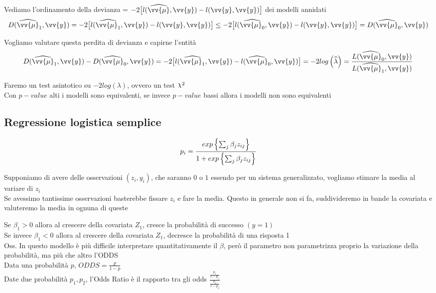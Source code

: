 Vediamo l'ordinamento della devianza = $-2\big[ l(\hat{\vv{\mu}},\vv{y}) - l(\vv{y},\vv{y}) \big]$ dei modelli annidati
\[
D(\hat{\vv{\mu}}_1,\vv{y}) = -2\big[ l(\hat{\vv{\mu}_1},\vv{y}) - l(\vv{y},\vv{y}) \big] \le -2\big[ l(\hat{\vv{\mu}_0},\vv{y}) - l(\vv{y},\vv{y}) \big] = D(\hat{\vv{\mu}}_0,\vv{y})
\]
\phantom{}

Vogliamo valutare questa perdita di devianza e capirne l'entità
\[
D(\hat{\vv{\mu}}_1,\vv{y})-D(\hat{\vv{\mu}}_0,\vv{y}) = -2\big[ l(\hat{\vv{\mu}_1},\vv{y}) - l(\hat{\vv{\mu}}_0,\vv{y}) \big] = -2log \O\hat{\lambda}\C = \frac{L(\hat{\vv{\mu}}_0,\vv{y})}{L(\hat{\vv{\mu}}_1,\vv{y})}
\]
\phantom{}

Faremo un test asintotico su $-2log(\lambda)$, ovvero un test $\Chi^2$\\
Con $p-value$ alti i modelli sono equivalenti, se invece $p-value$ bassi allora i modelli non sono equivalenti\\



\subsection{Regressione logistica semplice}

\[
p_i = \dfrac{exp\left\{\sum_j\beta_jz_{ij}\right\}}{1+exp\left\{\sum_j\beta_jz_{ij}\right\}}
\]

Supponiamo di avere delle osservazioni $(z_i,y_i)$, che saranno $0$ o $1$ essendo per un sistema generalizzato, vogliamo stimare la media al variare di $z_i$\\
Se avessimo tantissime osservazioni basterebbe fissare $z_i$ e fare la media. Questo in generale non si fa, suddivideremo in  bande la covariata e valuteremo la media in ognuna di queste


Se $\beta_1>0$ allora al crescere della covariata $Z_1$, cresce la probabilità di successo $(y=1)$\\
Se invece $\beta_1<0$ allora al crescere della covariata $Z_1$, decresce la probabilità di una risposta 1\\

Oss. In questo modello è più difficile interpretare quantitativamente il $\beta$, però il parametro non parametrizza proprio la variazione della probabilità, ma più che altro l'ODDS\\

Data una probabilità $p$, $ODDS=\frac{p}{1-p}$\\
Date due probabilità $p_1, p_2$, l'Odds Ratio è il rapporto tra gli odds $\frac{\tfrac{p_1}{1-p_1}}{\tfrac{p_2}{1-p_2}}$\\

